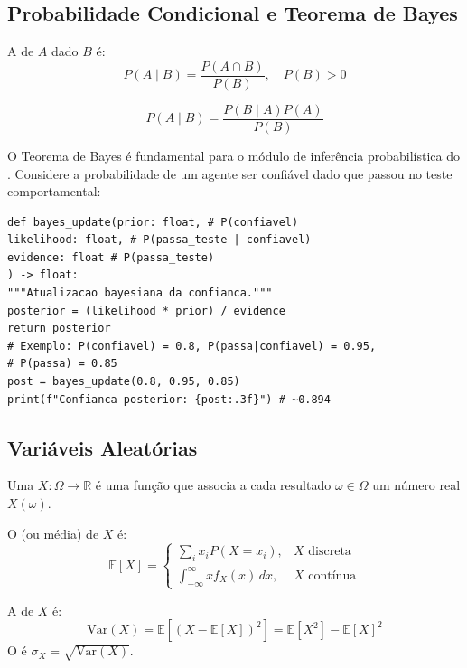 \subsection{Probabilidade Condicional e Teorema de Bayes}
\begin{definicao}
A  de $A$ dado $B$ é:
\[P(A \mid B) = \frac{P(A \cap B)}{P(B)}, \quad P(B) > 0
\]
\end{definicao}
\begin{teorema}
\[P(A \mid B) = \frac{P(B \mid A) P(A)}{P(B)}
\]
\end{teorema}
\begin{exemplo}
O Teorema de Bayes é fundamental para o módulo de inferência
probabilística do \opencodeeco{}. Considere a probabilidade de um agente
ser confiável dado que passou no teste comportamental:
\begin{lstlisting}[style=pythonstyle]
def bayes_update(prior: float, # P(confiavel)
likelihood: float, # P(passa_teste | confiavel)
evidence: float # P(passa_teste)
) -> float:
"""Atualizacao bayesiana da confianca."""
posterior = (likelihood * prior) / evidence
return posterior
# Exemplo: P(confiavel) = 0.8, P(passa|confiavel) = 0.95,
# P(passa) = 0.85
post = bayes_update(0.8, 0.95, 0.85)
print(f"Confianca posterior: {post:.3f}") # ~0.894
\end{lstlisting}
\end{exemplo}
\subsection{Variáveis Aleatórias}
\begin{definicao}
Uma  $X: \Omega \to \mathbb{R}$ é uma
função que associa a cada resultado $\omega \in \Omega$ um número real
$X(\omega)$.
\end{definicao}
\begin{definicao}
O  (ou média) de $X$ é:
\[\mathbb{E}[X] = \begin{cases}
\sum_i x_i P(X = x_i), & X \text{ discreta} \\[4pt]
\int_{-\infty}^{\infty} x f_X(x) \, dx, & X \text{ contínua}
\end{cases}
\]
\end{definicao}
\begin{definicao}[Variância]
A  de $X$ é:
\[\text{Var}(X) = \mathbb{E}[(X - \mathbb{E}[X])^2] =
\mathbb{E}[X^2] - \mathbb{E}[X]^2
\]
O  é $\sigma_X = \sqrt{\text{Var}(X)}$.
\end{definicao}
